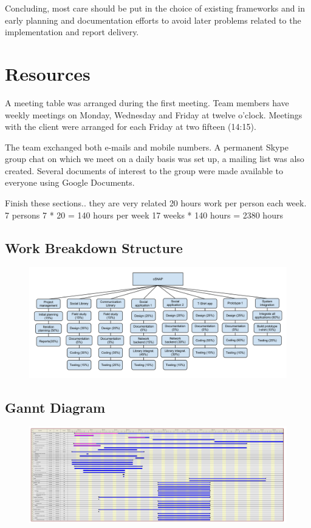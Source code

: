 Concluding, most care should be put in the choice of existing frameworks and in early planning
and documentation efforts to avoid later problems related to the implementation and report delivery.

\newpage
\section{Resources}
A meeting table was arranged during the first meeting. Team members
have weekly meetings on Monday, Wednesday and Friday at twelve o'clock.
Meetings with the client were arranged for each Friday at two fifteen (14:15).

The team exchanged both e-mails and mobile numbers. A permanent Skype
group chat on which we meet on a daily basis was set up, a mailing
list was also created. Several documents of interest to the group
were made available to everyone using Google Documents.

\todo
{
 Finish these sections.. they are very related
}
20 hours work per person each week.
7 persons
7 * 20 = 140 hours per week
17 weeks * 140 hours = 2380 hours

\subsection{Work Breakdown Structure}

\begin{figure}[h]
\centering \includegraphics[scale=0.30]{img/mgmt-wbs.png}
\label{fig:mgmt-wbs}
\end{figure}


\subsection{Gannt Diagram}

\begin{figure}[h]
\centering \includegraphics[angle=270, width=1\textwidth, trim=0mm 0mm 47.5cm 0mm, clip]{img/mgmt-gantt.pdf}
\label{fig:mgmt-gantt-1}
\end{figure}

